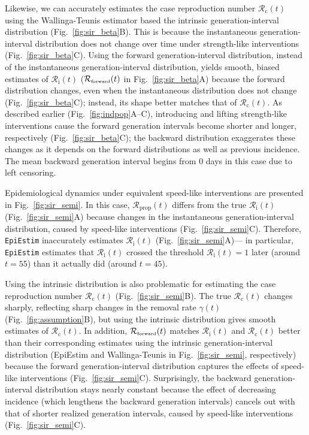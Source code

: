 \documentclass[12pt]{article}
\newcommand{\fref}[1]{Fig.~\ref{fig:#1}}
\newcommand{\Rx}[1]{\ensuremath{{\mathcal R}_{#1}}\xspace}
\newcommand{\Rc}{\Rx{\mathrm{c}}}
\newcommand{\Ri}{\Rx{\mathrm{i}}}
\newcommand{\RR}{\ensuremath{{\mathcal R}}\xspace}
\newcommand{\Rprop}{\Rx{\mathrm{prop}}}
\newcommand{\tsub}[2]{#1_{{\textrm{\tiny #2}}}}
\begin{document}
Likewise, we can accurately estimates the case reproduction number $\Rc(t)$ using the Wallinga-Teunis estimator based the intrinsic generation-interval distribution (\fref{sir_beta}B).
This is because the instantaneous generation-interval distribution does not change over time under strength-like interventions (\fref{sir_beta}C).
Using the forward generation-interval distribution, instead of the instantaneous generation-interval distribution, yields smooth, biased estimates of $\Ri(t)$ ($\tsub{\RR}{forward}(t)$ in \fref{sir_beta}A) because the forward distribution changes, even when the instantaneous distribution does not change (\fref{sir_beta}C);
instead, its shape better matches that of $\Rc(t)$.
As described earlier (\fref{indpop}A--C), introducing and lifting strength-like interventions cause the forward generation intervals become shorter and longer, respectively (\fref{sir_beta}C);
the backward distribution exaggerates these changes as it depends on the forward distributions as well as previous incidence.
The mean backward generation interval begins from 0 days in this case due to left censoring.

Epidemiological dynamics under equivalent speed-like interventions are presented in \fref{sir_semi}.
In this case, $\Rprop(t)$ differs from the true $\Ri(t)$ (\fref{sir_semi}A) because changes in the instantaneous generation-interval distribution, caused by speed-like interventions (\fref{sir_semi}C).
Therefore, \texttt{EpiEstim} inaccurately estimates $\Ri(t)$ (\fref{sir_semi}A)---
in particular, \texttt{EpiEstim} estimates that $\Ri(t)$ crossed the threshold $\Ri(t)=1$ later (around $t=55$) than it actually did (around $t=45$).

Using the intrinsic distribution is also problematic for estimating the case reproduction number $\Rc(t)$ (\fref{sir_semi}B).
The true $\Rc(t)$ changes sharply, reflecting sharp changes in the removal rate $\gamma(t)$ (\fref{assumption}B), but using the intrinsic distribution gives smooth estimates of $\Rc(t)$.
In addition, $\tsub{\RR}{forward}(t)$ matches $\Ri(t)$ and $\Rc(t)$ better than their corresponding estimates using the intrinsic generation-interval distribution (EpiEstim and Wallinga-Teunis in \fref{sir_semi}, respectively) because the forward generation-interval distribution captures the effects of speed-like interventions (\fref{sir_semi}C).
Surprisingly, the backward generation-interval distribution stays nearly constant because the effect of decreasing incidence (which lengthens the backward generation intervals) cancels out with that of shorter realized generation intervals, caused by speed-like interventions (\fref{sir_semi}C).
\end{document}
